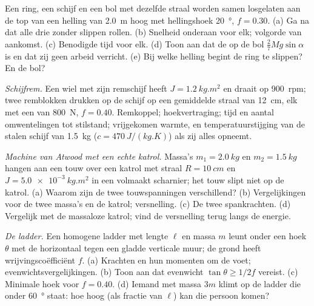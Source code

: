 \begin{exercise}[$\star\star$]\label{exo:b2:rigid-body-mechanics:5}
Een ring, een schijf en een bol met dezelfde straal worden samen
losgelaten aan de top van een helling van \qty{2.0}{m} hoog met
hellingshoek \qty{20}{\degree}, $f =
0.30$. (a) Ga na dat alle drie zonder
slippen rollen. (b) Snelheid onderaan voor elk; volgorde van aankomst.
(c) Benodigde tijd voor elk. (d) Toon aan dat de  op de bol
$\tfrac27Mg\sin\alpha$ is en dat zij geen arbeid verricht. (e) Bij welke
helling begint de ring te slippen? En de bol?
\end{exercise}

\begin{exercise}[$\star\star$]\label{exo:b2:rigid-body-mechanics:6}
\emph{Schijfrem.} Een wiel met zijn remschijf heeft $J = \qty{1.2}{kg.m^2}$
en draait op \qty{900}{rpm}; twee remblokken drukken op de schijf op een
gemiddelde straal van \qty{12}{cm}, elk met een  van
\qty{800}{N}, $f = 0.40$. Remkoppel; hoekvertraging; tijd en aantal
omwentelingen tot stilstand; vrijgekomen warmte, en temperatuurstijging
van de stalen schijf van \qty{1.5}{kg} ($c = \qty{470}{J/(kg.K)}$) als zij
alles opneemt.
\end{exercise}

\begin{exercise}[$\star\star$]\label{exo:b2:rigid-body-mechanics:7}
\emph{Machine van Atwood met een echte katrol.} Massa's $m_1 = \qty{2.0}{kg}$
en $m_2 = \qty{1.5}{kg}$ hangen aan een touw over een katrol met straal
$R =
\qty{10}{cm}$ en  $J = \qty{5.0e-3}{kg.m^2}$ in een
volmaakt
scharnier; het touw slipt niet op de katrol. (a) Waarom zijn de twee
touwspanningen verschillend? (b) Vergelijkingen voor de twee massa's en de
katrol; versnelling. (c) De twee spankrachten. (d) Vergelijk met de
massaloze katrol; vind de versnelling terug langs de energie.
\end{exercise}

\begin{exercise}[$\star\star$]\label{exo:b2:rigid-body-mechanics:8}
\emph{De ladder.} Een homogene ladder met lengte $\ell$ en massa $m$ leunt
onder een hoek $\theta$ met de horizontaal tegen een gladde verticale muur;
de grond heeft wrijvingscoëfficiënt $f$. (a) Krachten en hun momenten om
de voet; evenwichtsvergelijkingen. (b) Toon aan dat evenwicht
$\tan\theta \ge 1/2f$ vereist. (c) Minimale hoek voor $f = 0.40$. (d) Iemand
met massa $3m$ klimt op de ladder die onder \qty{60}{\degree} staat: hoe hoog
(als fractie van $\ell$) kan die persoon komen?
\end{exercise}

